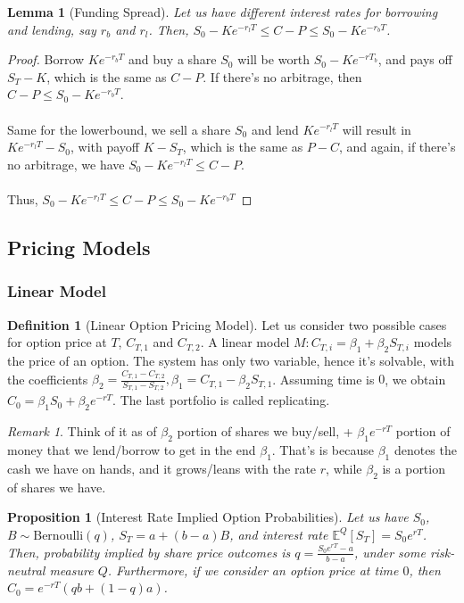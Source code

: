 \documentclass[11pt,a4paper]{article}
\theoremstyle{plain}
\newtheorem{lemma}[theorem]{Lemma}
\newtheorem{proposition}[theorem]{Proposition}
\theoremstyle{definition}
\newtheorem{definition}[theorem]{Definition}
\theoremstyle{remark}
\newtheorem*{remark}{Remark}
\newcommand{\1}{\mathbf{1}}
\begin{document}
\begin{lemma}[Funding Spread]
  Let us have different interest rates for borrowing and lending, say $r_b$ and $r_l$. Then, $S_0-Ke^{-r_lT}\le C-P\le S_0-Ke^{-r_bT}$.
\end{lemma}

\begin{proof}
  Borrow $Ke^{-r_bT}$ and buy a share $S_0$ will be worth $S_0-Ke^{-rT_b}$, and pays off $S_T-K$, which is the same as $C-P$. If there's no arbitrage, then $C-P\le S_0-Ke^{-r_bT}$.\\ \\
  Same for the lowerbound, we sell a share $S_0$ and lend $Ke^{-r_lT}$ will result in $Ke^{-r_lT}-S_0$, with payoff $K-S_T$, which is the same as $P-C$, and again, if there's no arbitrage, we have $S_0-Ke^{-r_lT}\le C-P$.\\ \\
  Thus, $S_0-Ke^{-r_lT}\le C-P\le S_0-Ke^{-r_bT}$
\end{proof}

\subsection{Pricing Models}

\subsubsection{Linear Model}

\begin{definition}[Linear Option Pricing Model]
  Let us consider two possible cases for option price at $T$, $C_{T,1}$ and $C_{T,2}$. A linear model $M:C_{T,i}=\beta_1+\beta_2S_{T,i}$ models the price of an option. The system has only two variable, hence it's solvable, with the coefficients $\beta_2=\frac{C_{T,1}-C_{T,2}}{S_{T,1}-S_{T,2}},\beta_1=C_{T,1}-\beta_2S_{T,1}$. Assuming time is $0$, we obtain $C_0=\beta_1S_0+\beta_2e^{-rT}$. The last portfolio is called replicating. 
\end{definition}

\begin{remark}
  Think of it as of $\beta_2$ portion of shares we buy/sell, + $\beta_1e^{-rT}$ portion of money that we lend/borrow to get in the end $\beta_1$. That's is because $\beta_1$ denotes the cash we have on hands, and it grows/leans with the rate $r$, while $\beta_2$ is a portion of shares we have.
\end{remark}

\begin{proposition}[Interest Rate Implied Option Probabilities]
  Let us have $S_0$, $B\sim\mathrm{Bernoulli}(q)$, $S_T=a+(b-a)B$, and interest rate $\mathbb{E}^Q[S_T]=S_0e^{rT}$. Then, probability implied by share price outcomes is $q=\frac{S_0e^{rT}-a}{b-a}$, under some risk-neutral measure $Q$. Furthermore, if we consider an option price at time $0$, then $C_0=e^{-rT}(qb+(1-q)a)$.
\end{proposition}
\end{document}
